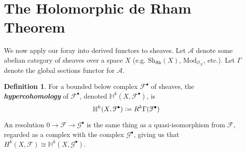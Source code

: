\documentclass[psamsfonts, 12pt]{amsart}
\theoremstyle{definition}
\newtheorem{defn}[thm]{Definition}
\theoremstyle{remark}
\renewcommand{\O}{\mathcal{O}}
\newcommand{\ib}[1]{\textbf{\textit{#1}}}
\newcommand{\defeq}{\vcentcolon=}
\begin{document}
\section{The Holomorphic de Rham Theorem}
%
We now apply our foray into derived functors to sheaves. Let
$\mathcal{A}$ denote some abelian category of sheaves over a space $X$
(e.g. $\mathrm{Sh}_{\mathsf{Ab}}(X)$, $\mathrm{Mod}_{\O_X}$, etc.).
Let $\Gamma$ denote the global sections functor for $\mathcal{A}$.
%
\begin{defn}
For a bounded below complex $\mathcal{F}^\bullet$ of sheaves, the \ib{hypercohomology}
of $\mathcal{F}^\bullet$, denoted $\mathbb{H}^k(X,\mathcal{F}^\bullet)$,
is
\[
\mathbb{H}^k(X,\mathcal{F}^\bullet) \defeq R^k\Gamma(\mathcal{F}^\bullet)
\]
\end{defn}
%
An resolution $0 \to \mathcal{F} \to \mathcal{G}^\bullet$ is
the same thing as a quasi-isomorphism from $\mathcal{F}$, regarded as a complex
with the complex $\mathcal{G}^\bullet$, giving us that
$H^k(X,\mathcal{F}) \cong \mathbb{H}^k(X,\mathcal{G}^\bullet)$. \\
\end{document}
